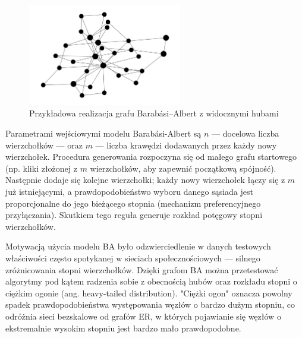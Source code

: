 \begin{figure}[h]
    \centering
    \includegraphics[width=0.6\textwidth]{assets/test_data/scalefree.png}
    \caption{Przykładowa realizacja grafu Barabási--Albert z widocznymi hubami}
    \label{fig:BA}
\end{figure}

Parametrami wejściowymi modelu Barabási-Albert są $n$ — docelowa liczba wierzchołków — oraz $m$ — liczba krawędzi dodawanych przez każdy nowy wierzchołek. Procedura generowania rozpoczyna się od małego grafu startowego (np. kliki złożonej z $m$ wierzchołków, aby zapewnić początkową spójność). Następnie dodaje się kolejne wierzchołki; każdy nowy wierzchołek łączy się z $m$ już istniejącymi, a prawdopodobieństwo wyboru danego sąsiada jest proporcjonalne do jego bieżącego stopnia (mechanizm preferencyjnego przyłączania). Skutkiem tego reguła generuje rozkład potęgowy stopni wierzchołków.

Motywacją użycia modelu BA było odzwierciedlenie w danych testowych właściwości często spotykanej w sieciach społecznościowych — silnego zróżnicowania stopni wierzchołków. Dzięki grafom BA można przetestować algorytmy pod kątem radzenia sobie z obecnością hubów oraz rozkładu stopni o ciężkim ogonie (ang. heavy-tailed distribution). "Ciężki ogon" oznacza powolny spadek prawdopodobieństwa występowania węzłów o bardzo dużym stopniu, co odróżnia sieci bezskalowe od grafów ER, w których pojawianie się węzłów o ekstremalnie wysokim stopniu jest bardzo mało prawdopodobne.

